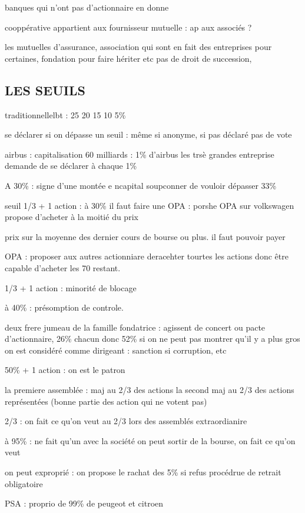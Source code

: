 \documentclass[a4paper,12pt]{article}
\begin{document}
banques qui n'ont pas d'actionnaire en donne 

cooppérative appartient aux fournisseur
mutuelle : ap aux associés ?

les mutuelles d'assurance, association qui sont en fait des entreprises pour certaines, 
fondation pour faire hériter etc pas de droit de succession, 


\subsection{LES SEUILS}
traditionnellelbt : 25 20 15 10 5\%

se déclarer si on dépasse un seuil : même si anonyme, si pas déclaré pas de vote

airbus : capitalisation 60 milliards : 1\% d'airbus
les trsè grandes entreprise demande de se déclarer à chaque 1\% 


A 30\% : signe d'une montée e ncapital
soupconner de vouloir dépasser 33\%

seuil 1/3 + 1 action : 
à 30\% il faut faire une OPA  :  porshe OPA sur volkswagen propose d'acheter à la moitié du prix

prix sur la moyenne des dernier cours de bourse ou plus. il faut pouvoir payer
 
OPA : proposer aux autres actionniare deracehter tourtes les actions donc être
capable d'acheter les 70 restant.

1/3 + 1 action : minorité de blocage

à 40\% : présomption de controle.

deux frere jumeau de la famille fondatrice : agissent de concert ou pacte d'actionnaire, 26\% chacun donc 52\%
si on ne peut pas montrer qu'il y a plus gros on est considéré comme dirigeant : sanction si corruption, etc

50\% + 1 action : on est le patron

la premiere assemblée :  maj au 2/3 des actions
la second maj au 2/3 des actions représentées (bonne partie des action qui ne votent pas)


2/3 : on fait ce qu'on veut au 2/3 lors des assemblés extraordianire

à 95\% : ne fait qu'un avec la société
on peut sortir de la bourse, on fait ce qu'on veut

on peut exproprié : on propose le rachat des 5\% si refus
procédrue de retrait obligatoire

PSA : proprio de 99\% de peugeot et citroen
\end{document}

